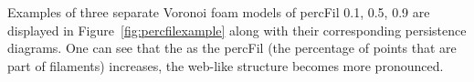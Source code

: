 \documentclass[12pt]{article}
\begin{document}


Examples of three separate Voronoi foam models of percFil 0.1, 0.5, 0.9 are displayed in Figure~\ref{fig:percfilexample} along with their corresponding persistence diagrams. One can see that the as the percFil (the percentage of points that are part of filaments) increases, the web-like structure becomes more pronounced.
\end{document}
